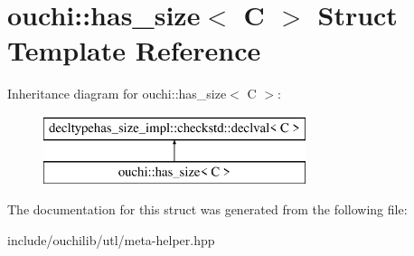\hypertarget{structouchi_1_1has__size}{}\section{ouchi\+::has\+\_\+size$<$ C $>$ Struct Template Reference}
\label{structouchi_1_1has__size}
Inheritance diagram for ouchi\+::has\+\_\+size$<$ C $>$\+:\begin{figure}[H]
\begin{center}
\leavevmode
\includegraphics[height=2.000000cm]{structouchi_1_1has__size}
\end{center}
\end{figure}


The documentation for this struct was generated from the following file\+:\begin{DoxyCompactItemize}
\item 
include/ouchilib/utl/meta-\/helper.\+hpp\end{DoxyCompactItemize}
